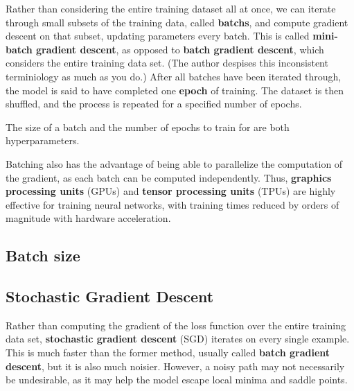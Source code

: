 \documentclass[12pt]{report}
\theoremstyle{definition}
\theoremstyle{remark}
\begin{document}
Rather than considering the entire training dataset all at once, we can iterate through small subsets of the training data, called \textbf{\glspl{batch}}, and compute gradient descent on that subset, updating parameters every batch. This is called \textbf{mini-batch gradient descent}, as opposed to \textbf{batch gradient descent}, which considers the entire training data set. (The author despises this inconsistent terminiology as much as you do.) After all batches have been iterated through, the model is said to have completed one \textbf{epoch} of training. The dataset is then shuffled, and the process is repeated for a specified number of epochs.

The size of a batch and the number of epochs to train for are both hyperparameters.

Batching also has the advantage of being able to parallelize the computation of the gradient, as each batch can be computed independently. Thus, \textbf{graphics processing units} (GPUs) and \textbf{tensor processing units} (TPUs) are highly effective for training neural networks, with training times reduced by orders of magnitude with hardware acceleration.

\subsection{Batch size}

\subsection{Stochastic Gradient Descent}

Rather than computing the gradient of the loss function over the entire training data set, \textbf{stochastic gradient descent} (SGD) iterates on every single example. This is much faster than the former method, usually called \textbf{batch gradient descent}, but it is also much noisier. However, a noisy path may not necessarily be undesirable, as it may help the model escape local minima and saddle points.
\end{document}
